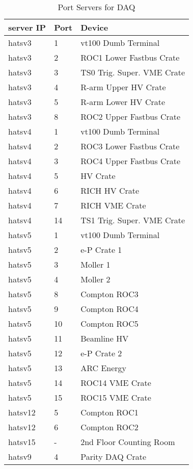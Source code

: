 {\begin{table}\centering
\caption[Data Acquisition: Port Servers for DAQ]{
Port Servers for DAQ}
\begin{tabular}{|l|l|l|}  \hline
server IP &  Port & Device \\ \hline
hatsv3    &   1     &  vt100 Dumb Terminal \\
hatsv3    &   2     &  ROC1 Lower Fastbus Crate \\
hatsv3    &   3     &  TS0 Trig. Super. VME Crate \\
hatsv3    &   4     &  R-arm Upper HV Crate \\
hatsv3    &   5     &  R-arm Lower HV Crate \\
hatsv3    &   8     &  ROC2 Upper Fastbus Crate \\
hatsv4    &   1     &  vt100 Dumb Terminal \\
hatsv4    &   2     &  ROC3 Lower Fastbus Crate \\
hatsv4    &   3     &  ROC4 Upper Fastbus Crate \\
hatsv4    &   5     &  HV Crate   \\
hatsv4    &   6     &  RICH HV Crate \\
hatsv4    &   7     &  RICH VME Crate \\
hatsv4    &   14    & TS1 Trig. Super. VME Crate \\
hatsv5    &   1     &  vt100 Dumb Terminal \\
hatsv5    &   2     &  e-P Crate 1 \\
hatsv5    &   3     &  Moller 1 \\
hatsv5    &   4     &  Moller 2 \\
hatsv5    &   8     &  Compton ROC3 \\
hatsv5    &   9     &  Compton ROC4 \\
hatsv5    &   10    &  Compton ROC5 \\
hatsv5    &   11    &  Beamline HV  \\
hatsv5    &   12    &  e-P Crate 2 \\
hatsv5    &   13    &  ARC Energy \\
hatsv5    &   14    &  ROC14 VME Crate \\
hatsv5    &   15    &  ROC15 VME Crate \\
hatsv12   &   5     &  Compton ROC1 \\
hatsv12   &   6     &  Compton ROC2 \\
hatsv15   &   -     &  2nd Floor Counting Room \\
hatsv9    &   4     &  Parity DAQ Crate \\
\hline
\end{tabular}
\end{table}

}
 
